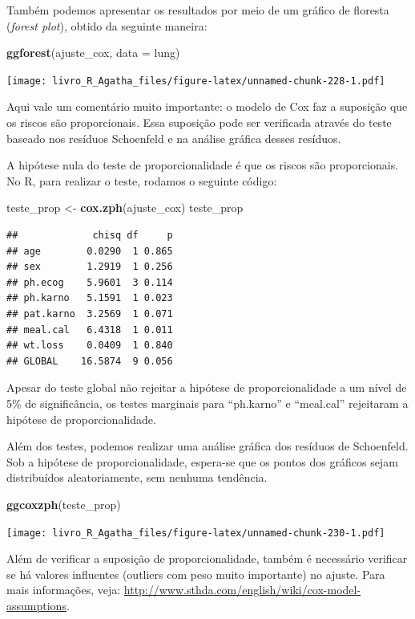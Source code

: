 \documentclass[
]{book}
\newenvironment{Shaded}{\begin{snugshade}}{\end{snugshade}}
\newcommand{\DataTypeTok}[1]{\textcolor[rgb]{0.13,0.29,0.53}{#1}}
\newcommand{\KeywordTok}[1]{\textcolor[rgb]{0.13,0.29,0.53}{\textbf{#1}}}
\newcommand{\NormalTok}[1]{#1}
\newcommand{\StringTok}[1]{\textcolor[rgb]{0.31,0.60,0.02}{#1}}
\begin{document}
Também podemos apresentar os resultados por meio de um gráfico de floresta (\emph{forest plot}), obtido da seguinte maneira:

\begin{Shaded}
\begin{Highlighting}[]
\KeywordTok{ggforest}\NormalTok{(ajuste_cox, }\DataTypeTok{data =}\NormalTok{ lung)}
\end{Highlighting}
\end{Shaded}

\texttt{[image: livro\_R\_Agatha\_files/figure-latex/unnamed-chunk-228-1.pdf]}

Aqui vale um comentário muito importante: o modelo de Cox faz a suposição que os riscos são proporcionais. Essa suposição pode ser verificada através do teste baseado nos resíduos Schoenfeld e na análise gráfica desses resíduos.

A hipótese nula do teste de proporcionalidade é que os riscos são proporcionais. No R, para realizar o teste, rodamos o seguinte código:

\begin{Shaded}
\begin{Highlighting}[]
\NormalTok{teste_prop <-}\StringTok{ }\KeywordTok{cox.zph}\NormalTok{(ajuste_cox)}
\NormalTok{teste_prop}
\end{Highlighting}
\end{Shaded}

\begin{verbatim}
##             chisq df     p
## age        0.0290  1 0.865
## sex        1.2919  1 0.256
## ph.ecog    5.9601  3 0.114
## ph.karno   5.1591  1 0.023
## pat.karno  3.2569  1 0.071
## meal.cal   6.4318  1 0.011
## wt.loss    0.0409  1 0.840
## GLOBAL    16.5874  9 0.056
\end{verbatim}

Apesar do teste global não rejeitar a hipótese de proporcionalidade a um nível de 5\% de significância, os testes marginais para ``ph.karno'' e ``meal.cal'' rejeitaram a hipótese de proporcionalidade.

Além dos testes, podemos realizar uma análise gráfica dos resíduos de Schoenfeld. Sob a hipótese de proporcionalidade, espera-se que os pontos dos gráficos sejam distribuídos aleatoriamente, sem nenhuma tendência.

\begin{Shaded}
\begin{Highlighting}[]
\KeywordTok{ggcoxzph}\NormalTok{(teste_prop)}
\end{Highlighting}
\end{Shaded}

\texttt{[image: livro\_R\_Agatha\_files/figure-latex/unnamed-chunk-230-1.pdf]}

Além de verificar a suposição de proporcionalidade, também é necessário verificar se há valores influentes (outliers com peso muito importante) no ajuste. Para mais informações, veja: \url{http://www.sthda.com/english/wiki/cox-model-assumptions}.

  
\end{document}
